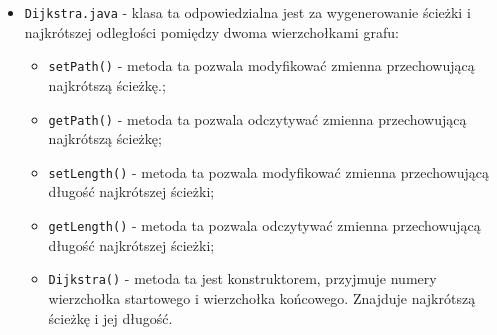 \documentclass[]{article}
\begin{document}
\begin{itemize}
\begin{itemize}
\end{itemize} 
\item
\texttt{Dijkstra.java} - klasa ta odpowiedzialna jest za wygenerowanie ścieżki i najkrótszej odległości pomiędzy dwoma wierzchołkami grafu:
\begin{itemize}
\item
\texttt{setPath()} - metoda ta pozwala modyfikować zmienna przechowującą najkrótszą ścieżkę.;
\item
\texttt{getPath()} - metoda ta pozwala odczytywać zmienna przechowującą najkrótszą ścieżkę;
\item
\texttt{setLength()} - metoda ta pozwala modyfikować zmienna przechowującą długość najkrótszej ścieżki; 
\item
\texttt{getLength()} - metoda ta pozwala odczytywać zmienna przechowującą długość najkrótszej ścieżki; 
\item
\texttt{Dijkstra()} - metoda ta jest konstruktorem, przyjmuje numery  wierzchołka startowego i wierzchołka końcowego. Znajduje najkrótszą ścieżkę i jej długość. 
\end{itemize} 
\end{itemize}
\end{document}
